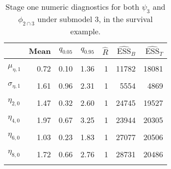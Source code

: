 \begin{table}

\caption{\label{tab:surv-stage-one-submodel-three}Stage one numeric diagnostics for both $\psi_{3}$ and $\phi_{2 \cap 3}$ under submodel 3, in the survival example.}
\centering
\begin{tabular}[t]{lrrrrrr}
\toprule
  & Mean & $q_{0.05}$ & $q_{0.95}$ & $\widehat{R}$ & $\widehat{\text{ESS}}_{B}$ & $\widehat{\text{ESS}}_{T}$\\
\midrule
\cellcolor{gray!6}{$\mu_{\eta, 0}$} & \cellcolor{gray!6}{1.89} & \cellcolor{gray!6}{1.51} & \cellcolor{gray!6}{2.28} & \cellcolor{gray!6}{1} & \cellcolor{gray!6}{14434} & \cellcolor{gray!6}{18892}\\
$\mu_{\eta, 1}$ & 0.72 & 0.10 & 1.36 & 1 & 11782 & 18081\\
\cellcolor{gray!6}{$\sigma_{\eta, 0}$} & \cellcolor{gray!6}{1.07} & \cellcolor{gray!6}{0.74} & \cellcolor{gray!6}{1.43} & \cellcolor{gray!6}{1} & \cellcolor{gray!6}{10210} & \cellcolor{gray!6}{11156}\\
$\sigma_{\eta, 1}$ & 1.61 & 0.96 & 2.31 & 1 & 5554 & 4869\\
\cellcolor{gray!6}{$\eta_{1,  0}$} & \cellcolor{gray!6}{0.58} & \cellcolor{gray!6}{-0.27} & \cellcolor{gray!6}{1.43} & \cellcolor{gray!6}{1} & \cellcolor{gray!6}{26281} & \cellcolor{gray!6}{19156}\\
$\eta_{2,  0}$ & 1.47 & 0.32 & 2.60 & 1 & 24745 & 19527\\
\cellcolor{gray!6}{$\eta_{3,  0}$} & \cellcolor{gray!6}{3.23} & \cellcolor{gray!6}{2.25} & \cellcolor{gray!6}{4.21} & \cellcolor{gray!6}{1} & \cellcolor{gray!6}{14827} & \cellcolor{gray!6}{18305}\\
$\eta_{4,  0}$ & 1.97 & 0.67 & 3.25 & 1 & 23944 & 20305\\
\cellcolor{gray!6}{$\eta_{5,  0}$} & \cellcolor{gray!6}{1.23} & \cellcolor{gray!6}{0.17} & \cellcolor{gray!6}{2.29} & \cellcolor{gray!6}{1} & \cellcolor{gray!6}{21723} & \cellcolor{gray!6}{18811}\\
$\eta_{6,  0}$ & 1.03 & 0.23 & 1.83 & 1 & 27077 & 20506\\
\cellcolor{gray!6}{$\eta_{7,  0}$} & \cellcolor{gray!6}{4.03} & \cellcolor{gray!6}{2.65} & \cellcolor{gray!6}{5.42} & \cellcolor{gray!6}{1} & \cellcolor{gray!6}{13188} & \cellcolor{gray!6}{15171}\\
$\eta_{8,  0}$ & 1.72 & 0.66 & 2.76 & 1 & 28731 & 20486\\
\cellcolor{gray!6}{$\eta_{9,  0}$} & \cellcolor{gray!6}{1.13} & \cellcolor{gray!6}{0.24} & \cellcolor{gray!6}{2.02} & \cellcolor{gray!6}{1} & \cellcolor{gray!6}{32704} & \cellcolor{gray!6}{20594}\\

\end{tabular}
\end{table}
